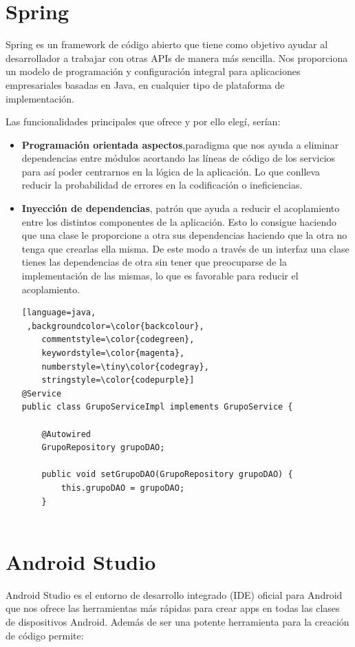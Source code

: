 	
	
\section{Spring}
Spring es un framework de código abierto que tiene como objetivo ayudar al desarrollador a trabajar con otras APIs de manera más sencilla. Nos proporciona un modelo de programación y configuración integral para aplicaciones empresariales basadas en Java, en cualquier tipo de plataforma de implementación. 
	
Las funcionalidades principales que ofrece y por ello elegí, serían:

\begin{itemize}
\item \textbf{Programación orientada aspectos},paradigma que nos ayuda a eliminar dependencias entre módulos acortando las líneas de código de los servicios para así poder centrarnos en la lógica de la aplicación. Lo que conlleva reducir  la probabilidad de errores en la codificación o ineficiencias.


\item\textbf{ Inyección de dependencias}, patrón que ayuda a reducir el acoplamiento entre los distintos componentes de la aplicación. Esto lo consigue haciendo que una clase le proporcione a otra sus dependencias haciendo que la otra no tenga que crearlas ella misma. De este modo a través de un interfaz una clase tienes las dependencias de otra sin tener que preocuparse de la implementación de las mismas, lo que es favorable para reducir el acoplamiento.





\begin{lstlisting}[language=java,
 ,backgroundcolor=\color{backcolour},   
    commentstyle=\color{codegreen},
    keywordstyle=\color{magenta},
    numberstyle=\tiny\color{codegray},
    stringstyle=\color{codepurple}]  
@Service
public class GrupoServiceImpl implements GrupoService {

	@Autowired
	GrupoRepository grupoDAO;

	public void setGrupoDAO(GrupoRepository grupoDAO) {
		this.grupoDAO = grupoDAO;
	}


\end{lstlisting} 



\end{itemize}


\section{Android Studio}
Android Studio es el entorno de desarrollo integrado (IDE)  oficial para Android que nos ofrece las herramientas más rápidas para crear apps en todas las clases de dispositivos Android.
Además de ser una potente herramienta para la creación de código permite:

